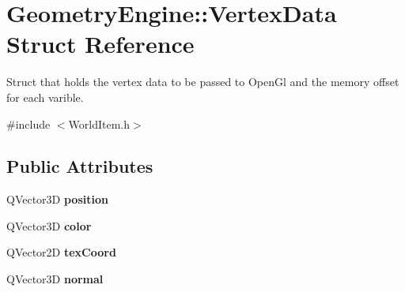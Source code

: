 \hypertarget{struct_geometry_engine_1_1_vertex_data}{}\section{Geometry\+Engine\+::Vertex\+Data Struct Reference}
\label{struct_geometry_engine_1_1_vertex_data}


Struct that holds the vertex data to be passed to Open\+Gl and the memory offset for each varible.  




{\ttfamily \#include $<$World\+Item.\+h$>$}

\subsection*{Public Attributes}
\begin{DoxyCompactItemize}
\item 
\mbox{\label{struct_geometry_engine_1_1_vertex_data_ac7ccad23d01361ea3ae3311189e2318b}} 
Q\+Vector3D {\bfseries position}
\item 
\mbox{\label{struct_geometry_engine_1_1_vertex_data_a8151945091e751e05ab756f7969264c4}} 
Q\+Vector3D {\bfseries color}
\item 
\mbox{\label{struct_geometry_engine_1_1_vertex_data_a19913645695e877cbdf9a0865b39ace0}} 
Q\+Vector2D {\bfseries tex\+Coord}
\item 
\mbox{\label{struct_geometry_engine_1_1_vertex_data_a8487ac2c94913526c98b99d61b5e7c57}} 
Q\+Vector3D {\bfseries normal}
\end{DoxyCompactItemize}
